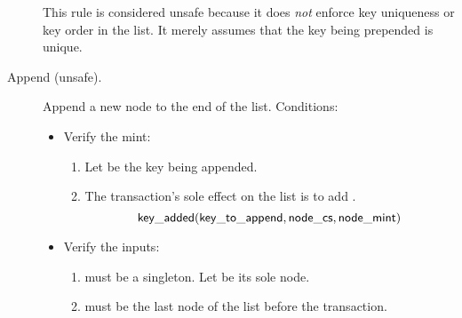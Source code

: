 \documentclass[../midgard.tex]{subfiles}
\begin{document}
\begin{description}
    This rule is considered unsafe because it does \emph{not} enforce key uniqueness or key order in the list.
    It merely assumes that the key being prepended is unique.

    \unorderedListWarning 

    \item[Append (unsafe).] Append a new node to the end of the list.
      Conditions:
        \begin{itemize}
            \item Verify the mint:
            \begin{enumerate}
                \item Let  be the key being appended.
                
                \item The transaction's sole effect on the list is to add .
                    \begin{equation*}
                        \mathsf{key\_added}(\mathsf{key\_to\_append}, \mathsf{node\_cs}, \mathsf{node\_mint})
                    \end{equation*}
            \end{enumerate}
            
            \item Verify the inputs:
            \begin{enumerate}[resume]
                \item {} must be a singleton.
                  Let  be its sole node.
                \item {} must be the last node of the list before the transaction.
            \end{enumerate}
            

\end{itemize}
\end{description}
\end{document}
